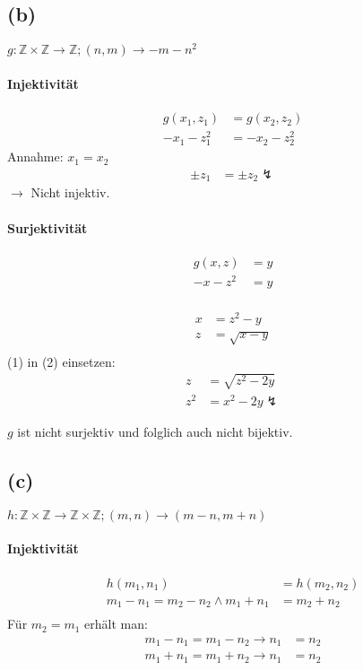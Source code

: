 \documentclass[11pt,a4paper]{article}
\begin{document}
\subsection{(b)}

$g: \mathbb{Z} \times \mathbb{Z} \rightarrow \mathbb{Z}; (n,m) \rightarrow -m-n^2$

\paragraph{Injektivität}
\begin{align*}
g(x_1, z_1) &= g(x_2, z_2)\\
-x_1-z_1^2 &= -x_2-z_2^2
\end{align*}
Annahme: $x_1 = x_2$
\begin{align*}
\pm z_1 &= \pm z_2 \lightning
\end{align*}
$\rightarrow$ Nicht injektiv.

\paragraph{Surjektivität}
\begin{align*}
g(x, z) &= y\\
-x-z^2 &= y\\
\end{align*}

\begin{align}
x &= z^2-y\\
z &= \sqrt{x-y}\\
\end{align}
(1) in (2) einsetzen:
\begin{align*}
z &= \sqrt{z^2-2y}\\
z^2 &= x^2-2y \lightning
\end{align*}

$g$ ist nicht surjektiv und folglich auch nicht bijektiv.

\newpage

\subsection{(c)}
$h: \mathbb{Z} \times \mathbb{Z} \rightarrow \mathbb{Z} \times \mathbb{Z}; (m,n) \rightarrow (m-n, m+n)$

\paragraph{Injektivität}
\begin{align*}
h(m_1, n_1) &= h(m_2, n_2)\\
m_1-n_1 = m_2-n_2 \wedge m_1+n_1 &= m_2+n_2\\
\end{align*}
Für $m_2 = m_1$ erhält man:
\begin{align*}
m_1-n_1 = m_1-n_2 \rightarrow n_1 &= n_2\\
m_1+n_1 = m_1+n_2 \rightarrow n_1 &= n_2
\end{align*}
\end{document}
